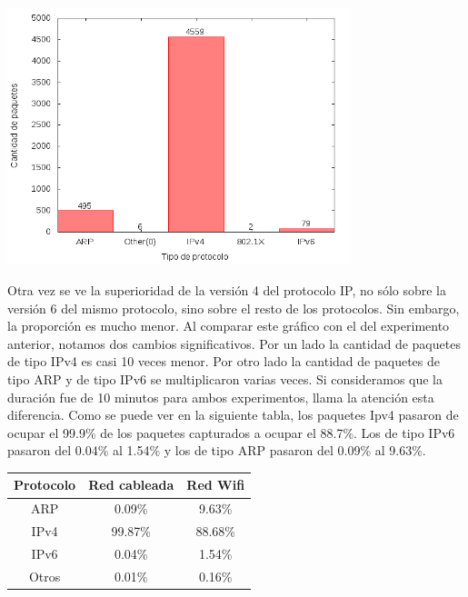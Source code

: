 \includegraphics[width=10cm]{../mediciones/home-wfi-10/home-wfi-10Protocolos.png}

Otra vez se ve la superioridad de la versión 4 del protocolo IP, no sólo sobre la versión 6 del mismo protocolo, sino sobre el resto de los protocolos.
Sin embargo, la proporción es mucho menor. Al comparar este gráfico con el del experimento anterior, notamos dos cambios significativos. Por un lado la cantidad
de paquetes de tipo IPv4 es casi 10 veces menor. Por otro lado la cantidad de paquetes de tipo ARP y de tipo IPv6 se multiplicaron varias veces. Si consideramos
que la duración fue de 10 minutos para ambos experimentos, llama la atención esta diferencia. Como se puede ver en la siguiente tabla, los paquetes Ipv4 pasaron
de ocupar el 99.9\% de los paquetes capturados a ocupar el 88.7\%. Los de tipo IPv6 pasaron del 0.04\% al 1.54\% y los de tipo ARP pasaron del 0.09\% al 9.63\%.

\begin{center}
\begin{tabular}{|c||c|c|}
\hline
Protocolo & Red cableada & Red Wifi \\
\hline
ARP & 0.09\% & 9.63\% \\
\hline
IPv4 & 99.87\% & 88.68\% \\
\hline
IPv6 & 0.04\% & 1.54\% \\
\hline
Otros & 0.01\% & 0.16\% \\
\hline
\end{tabular}
\end{center}

